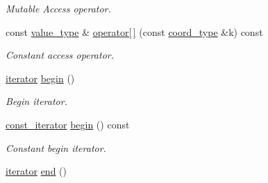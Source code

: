 \begin{DoxyCompactItemize}
\begin{DoxyCompactList}\small\item\em Mutable Access operator. \end{DoxyCompactList}\item 
\hypertarget{class_d_o_1_1_sparse_multi_array_a53e649bdfcb910262e552bbe9678c1dd}{const \hyperlink{class_d_o_1_1_sparse_multi_array_a265a253612b46abed17c61b0a5e5ce30}{value\-\_\-type} \& \hyperlink{class_d_o_1_1_sparse_multi_array_a53e649bdfcb910262e552bbe9678c1dd}{operator\mbox{[}$\,$\mbox{]}} (const \hyperlink{class_d_o_1_1_sparse_multi_array_ae4fb477425bbeb20329d300396ac2582}{coord\-\_\-type} \&k) const }\label{class_d_o_1_1_sparse_multi_array_a53e649bdfcb910262e552bbe9678c1dd}

\begin{DoxyCompactList}\small\item\em Constant access operator. \end{DoxyCompactList}\item 
\hypertarget{class_d_o_1_1_sparse_multi_array_ad69bd11391be1a1dba5c8202259664f8}{\hyperlink{class_d_o_1_1_sparse_multi_array_aeb7d6a472fc07a6f5c9761e906c9f826}{iterator} \hyperlink{class_d_o_1_1_sparse_multi_array_ad69bd11391be1a1dba5c8202259664f8}{begin} ()}\label{class_d_o_1_1_sparse_multi_array_ad69bd11391be1a1dba5c8202259664f8}

\begin{DoxyCompactList}\small\item\em Begin iterator. \end{DoxyCompactList}\item 
\hypertarget{class_d_o_1_1_sparse_multi_array_aa4b02d4f1a8500fb07a551069060709f}{\hyperlink{class_d_o_1_1_sparse_multi_array_a136285f5e1620856973c0c4007453a57}{const\-\_\-iterator} \hyperlink{class_d_o_1_1_sparse_multi_array_aa4b02d4f1a8500fb07a551069060709f}{begin} () const }\label{class_d_o_1_1_sparse_multi_array_aa4b02d4f1a8500fb07a551069060709f}

\begin{DoxyCompactList}\small\item\em Constant begin iterator. \end{DoxyCompactList}\item 
\hypertarget{class_d_o_1_1_sparse_multi_array_acad38d52497a975bfb6f2f6acd76631f}{\hyperlink{class_d_o_1_1_sparse_multi_array_aeb7d6a472fc07a6f5c9761e906c9f826}{iterator} \hyperlink{class_d_o_1_1_sparse_multi_array_acad38d52497a975bfb6f2f6acd76631f}{end} ()}\label{class_d_o_1_1_sparse_multi_array_acad38d52497a975bfb6f2f6acd76631f}


\end{DoxyCompactItemize}
